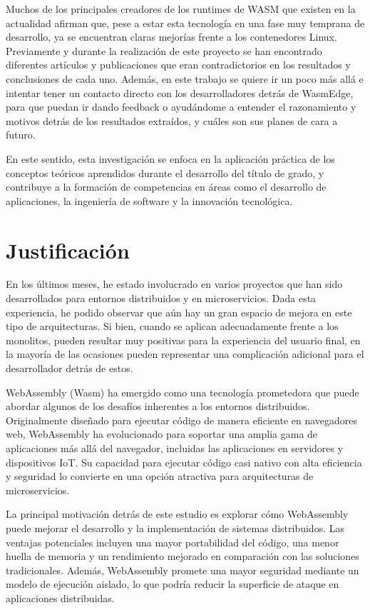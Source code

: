 Muchos de los principales creadores de los runtimes de WASM que existen en la actualidad afirman que, pese a estar esta tecnología en una fase muy temprana de desarrollo, ya se encuentran claras mejorías frente a los contenedores Linux. Previamente y durante la realización de este proyecto se han encontrado diferentes artículos y publicaciones que eran contradictorios en los resultados y conclusiones de cada uno. Además, en este trabajo se quiere ir un poco más allá e intentar tener un contacto directo con los desarrolladores detrás de WasmEdge, para que puedan ir dando feedback o ayudándome a entender el razonamiento y motivos detrás de los resultados extraídos, y cuáles son sus planes de cara a futuro.

En este sentido, esta investigación se enfoca en la aplicación práctica de los conceptos teóricos aprendidos durante el desarrollo del título de grado, y contribuye a la formación de competencias en áreas como el desarrollo de aplicaciones, la ingeniería de software y la innovación tecnológica.

\section{Justificación}

En los últimos meses, he estado involucrado en varios proyectos que han sido desarrollados para entornos distribuidos y en microservicios. Dada esta experiencia, he podido observar que aún hay un gran espacio de mejora en este tipo de arquitecturas. Si bien, cuando se aplican adecuadamente frente a los monolitos, pueden resultar muy positivas para la experiencia del usuario final, en la mayoría de las ocasiones pueden representar una complicación adicional para el desarrollador detrás de estos.

WebAssembly (Wasm) ha emergido como una tecnología prometedora que puede abordar algunos de los desafíos inherentes a los entornos distribuidos. Originalmente diseñado para ejecutar código de manera eficiente en navegadores web, WebAssembly ha evolucionado para soportar una amplia gama de aplicaciones más allá del navegador, incluidas las aplicaciones en servidores y dispositivos IoT. Su capacidad para ejecutar código casi nativo con alta eficiencia y seguridad lo convierte en una opción atractiva para arquitecturas de microservicios.

La principal motivación detrás de este estudio es explorar cómo WebAssembly puede mejorar el desarrollo y la implementación de sistemas distribuidos. Las ventajas potenciales incluyen una mayor portabilidad del código, una menor huella de memoria y un rendimiento mejorado en comparación con las soluciones tradicionales. Además, WebAssembly promete una mayor seguridad mediante un modelo de ejecución aislado, lo que podría reducir la superficie de ataque en aplicaciones distribuidas.

